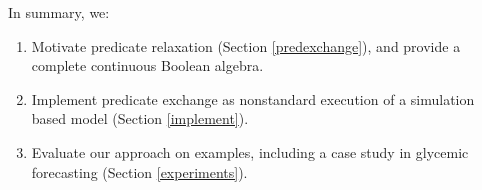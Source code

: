 In summary, we:

\begin{enumerate}
	\item Motivate predicate relaxation (Section \ref{predexchange}), and provide a complete continuous Boolean algebra.
	\item Implement predicate exchange as nonstandard execution of a simulation based model (Section \ref{implement}).
	\item Evaluate our approach on examples, including a case study in glycemic forecasting (Section \ref{experiments}).
\end{enumerate}



